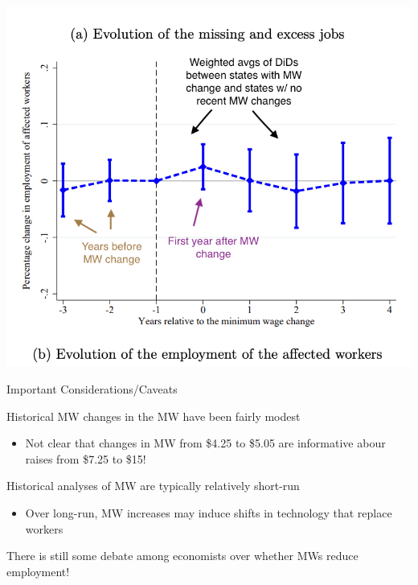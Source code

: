 \documentclass[11pt,english,handout]{beamer}
\newenvironment{wideitemize}{\itemize\addtolength{\itemsep}{10pt}}{\enditemize}
\begin{document}
\begin{frame}
	\includegraphics[width =0.9 \linewidth]{cengiz_eventstudy3}
\end{frame}


\begin{frame}{Important Considerations/Caveats}
	\begin{wideitemize}
		\item
		Historical MW changes in the MW have been fairly modest
			\begin{itemize}
				\item 
				Not clear that changes in MW from \$4.25 to \$5.05 are informative abour raises from \$7.25 to \$15!
			\end{itemize}
		
		\pause
		\item
		Historical analyses of MW are typically relatively short-run
			\begin{itemize}
				\item 
				Over long-run, MW increases may induce shifts in technology that replace workers
			\end{itemize}
		
		\pause
		\item
		There is still some debate among economists over whether MWs reduce employment!
	\end{wideitemize}
\end{frame}
\end{document}
